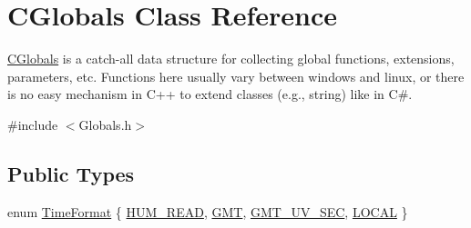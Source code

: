 \hypertarget{classCGlobals}{\section{C\-Globals Class Reference}
\label{classCGlobals}
}


\hyperlink{classCGlobals}{C\-Globals} is a catch-\/all data structure for collecting global functions, extensions, parameters, etc. Functions here usually vary between windows and linux, or there is no easy mechanism in C++ to extend classes (e.\-g., string) like in C\#.  




{\ttfamily \#include $<$Globals.\-h$>$}

\subsection*{Public Types}
\begin{DoxyCompactItemize}
\item 
enum \hyperlink{classCGlobals_a32f8f289bca445b5a2f6d1c68b6cbbb2}{Time\-Format} \{ \hyperlink{classCGlobals_a32f8f289bca445b5a2f6d1c68b6cbbb2a98adc6b59af1736f60ba1f8463521dc1}{H\-U\-M\-\_\-\-R\-E\-A\-D}, 
\hyperlink{classCGlobals_a32f8f289bca445b5a2f6d1c68b6cbbb2ae2624dc9f15430f7e5d885c3807adac3}{G\-M\-T}, 
\hyperlink{classCGlobals_a32f8f289bca445b5a2f6d1c68b6cbbb2ab0c064ba74b13a541bb4b8379bca2ae7}{G\-M\-T\-\_\-\-U\-V\-\_\-\-S\-E\-C}, 
\hyperlink{classCGlobals_a32f8f289bca445b5a2f6d1c68b6cbbb2a96d704987b0540065f6bd4c566a83760}{L\-O\-C\-A\-L}
 \}
\end{DoxyCompactItemize}
